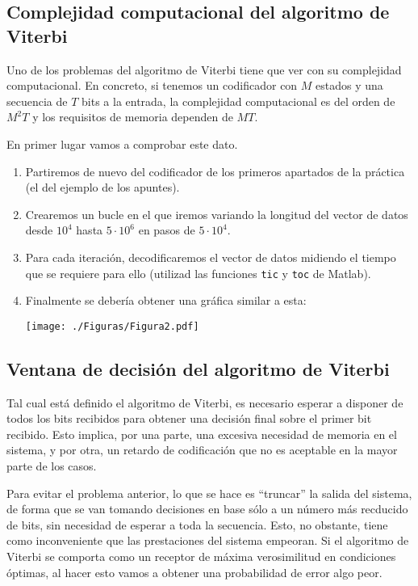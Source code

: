 \documentclass[es,practica,12pt]{uah}
\begin{document}
\subsection{Complejidad computacional del algoritmo de Viterbi}
Uno de los problemas del algoritmo de Viterbi tiene que ver con su complejidad computacional. En concreto, si tenemos un codificador con $M$ estados y una secuencia de $T$ bits a la entrada, la complejidad computacional es del orden de $M^2 T$ y los requisitos de memoria dependen de $MT$. 

En primer lugar vamos a comprobar este dato. 

\begin{enumerate}
	\item Partiremos de nuevo del codificador de los primeros apartados de la práctica (el del ejemplo de los apuntes).
	\item Crearemos un bucle en el que iremos variando la longitud del vector de datos desde $10^4$ hasta $5\cdot10^6$ en pasos de $5\cdot 10^4$. 
	\item Para cada iteración, decodificaremos el vector de datos midiendo el tiempo que se requiere para ello (utilizad las funciones \texttt{tic} y \texttt{toc} de Matlab).
	\item Finalmente se debería obtener una gráfica similar a esta:
	
	\centering\texttt{[image: ./Figuras/Figura2.pdf]}
\end{enumerate}


\subsection{Ventana de decisión del algoritmo de Viterbi}

Tal cual está definido el algoritmo de Viterbi, es necesario esperar a disponer de todos los bits recibidos para obtener una decisión final sobre el primer bit recibido. Esto implica, por una parte, una excesiva necesidad de memoria en el sistema, y por otra, un retardo de codificación que no es aceptable en la mayor parte de los casos. 

Para evitar el problema anterior, lo que se hace es ``truncar'' la salida del sistema, de forma que se van tomando decisiones en base sólo a un número más recducido de bits, sin necesidad de esperar a toda la secuencia. Esto, no obstante, tiene como inconveniente que las prestaciones del sistema empeoran. Si el algoritmo de Viterbi se comporta como un receptor de máxima verosimilitud en condiciones óptimas, al hacer esto vamos a obtener una probabilidad de error algo peor. 
\end{document}
